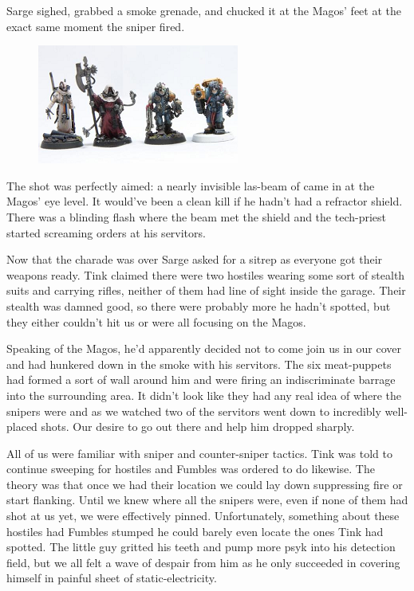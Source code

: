Sarge sighed, grabbed a smoke grenade, and chucked it at the Magos' feet at the exact same moment the sniper fired.

\begin{figure}
	\begin{center}
		\includegraphics[width=\figwidth]{pics/11/22.png}
	\end{center}
\end{figure}
The shot was perfectly aimed: 
a nearly invisible las-beam of came in at the Magos' eye level. 
It would've been a clean kill if he hadn't had a refractor shield. 
There was a blinding flash where the beam met the shield and the tech-priest started screaming orders at his servitors. 


Now that the charade was over Sarge asked for a sitrep as everyone got their weapons ready. 
Tink claimed there were two hostiles wearing some sort of stealth suits and carrying rifles, neither of them had line of sight inside the garage. 
Their stealth was damned good, so there were probably more he hadn't spotted, but they either couldn't hit us or were all focusing on the Magos. 


Speaking of the Magos, he'd apparently decided not to come join us in our cover and had hunkered down in the smoke with his servitors. 
The six meat-puppets had formed a sort of wall around him and were firing an indiscriminate barrage into the surrounding area. 
It didn't look like they had any real idea of where the snipers were and as we watched two of the servitors went down to incredibly well-placed shots. 
Our desire to go out there and help him dropped sharply.

All of us were familiar with sniper and counter-sniper tactics. 
Tink was told to continue sweeping for hostiles and Fumbles was ordered to do likewise. 
The theory was that once we had their location we could lay down suppressing fire or start flanking. 
Until we knew where all the snipers were, even if none of them had shot at us yet, we were effectively pinned. 
Unfortunately, something about these hostiles had Fumbles stumped he could barely even locate the ones Tink had spotted. 
The little guy gritted his teeth and pump more psyk into his detection field, but we all felt a wave of despair from him as he only succeeded in covering himself in painful sheet of static-electricity. 


